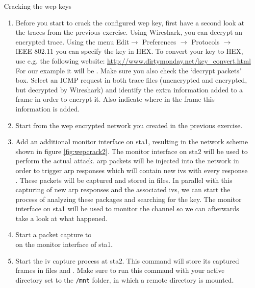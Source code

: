\begin{exercise}{Cracking the \ac{wep} keys}
	
	\begin{enumerate}
		\item Before you start to crack the configured \ac{wep} key, first have a second look at the traces from the previous exercise. Using Wireshark\cite{wireshark}, you can decrypt an encrypted trace. Using the menu Edit$\rightarrow$ Preferences $\rightarrow$ Protocols $\rightarrow$ IEEE 802.11 you can specify the key in HEX. To convert your key to HEX, use e.g. the following website: \url{http://www.dirtymonday.net/key_convert.html} For our example it will be .\newline
Make sure you also check the `decrypt packets' box. Select an ICMP request in both trace files (unencrypted and encrypted, but decrypted by Wireshark) and identify the extra information added to a frame in order to encrypt it. Also indicate where in the frame this information is added.\newline
		\begin{esolution}
		\end{esolution}
		\item Start from the \ac{wep} encrypted network you created in the previous exercise.
		\item Add an additional monitor interface on \ac{sta}1, resulting in the network scheme shown in figure \ref{fig:wepcrack2}. The monitor interface on \ac{sta}2 will be used to perform the actual attack. \ac{arp} packets will be injected into the network in order to trigger \ac{arp} responses which will contain new \acp{iv} with every response . These packets will be captured and stored in files. In parallel with this capturing of new \ac{arp} responses and the associated \acp{iv}, we can start the process of analyzing these packages and searching for the key. The monitor interface on \ac{sta}1 will be used to monitor the channel so we can afterwards take a look at what happened.
		\item Start a packet capture to \\ on the monitor interface of \ac{sta}1.
		\item Start the \ac{iv} capture process at \ac{sta}2. This command will store its captured frames in files  and . Make sure to run this command with your active directory set to the \texttt{/mnt} folder, in which a remote directory is mounted.\newline

\end{enumerate}
\end{exercise}
